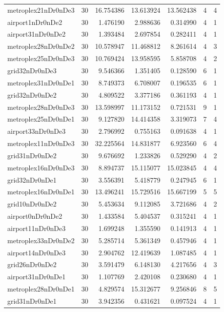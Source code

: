 \documentclass[../../../thesis.tex]{subfiles}
\begin{document}
\begin{longtable}{|l|r|r|r|r|r|r|}
metroplex21nDr0nDe3 & 30 & 16.754386 & 13.613924 & 13.562438 & 4 & 4 \\
airport1nDr0nDe2 & 30 & 1.476190 & 2.988636 & 0.314990 & 4 & 1 \\
airport31nDr0nDe2 & 30 & 1.393484 & 2.697854 & 0.282411 & 4 & 1 \\
metroplex28nDr0nDe2 & 30 & 10.578947 & 11.468812 & 8.261614 & 4 & 3 \\
metroplex25nDr0nDe3 & 30 & 10.769424 & 13.958595 & 5.858708 & 4 & 2 \\
grid32nDr0nDe3 & 30 & 9.546366 & 1.351405 & 0.128590 & 6 & 1 \\
metroplex31nDr0nDe1 & 30 & 8.749373 & 6.708007 & 0.196535 & 6 & 1 \\
grid32nDr0nDe2 & 30 & 4.809522 & 3.377186 & 0.361193 & 4 & 1 \\
metroplex28nDr0nDe3 & 30 & 13.598997 & 11.173152 & 0.721531 & 9 & 1 \\
metroplex25nDr0nDe1 & 30 & 9.127820 & 14.414358 & 3.319073 & 7 & 4 \\
airport33nDr0nDe3 & 30 & 2.796992 & 0.755163 & 0.091638 & 4 & 1 \\
metroplex11nDr0nDe3 & 30 & 32.225564 & 14.831877 & 6.923560 & 6 & 4 \\
grid31nDr0nDe2 & 30 & 9.676692 & 1.233826 & 0.529290 & 4 & 2 \\
metroplex16nDr0nDe3 & 30 & 8.894737 & 15.115077 & 15.023845 & 4 & 4 \\
grid32nDr0nDe1 & 30 & 3.556391 & 5.418779 & 0.247945 & 6 & 1 \\
metroplex16nDr0nDe1 & 30 & 13.496241 & 15.729516 & 15.667199 & 5 & 5 \\
grid10nDr0nDe2 & 30 & 5.453634 & 9.112085 & 3.721686 & 4 & 2 \\
airport0nDr0nDe2 & 30 & 1.433584 & 5.404537 & 0.315241 & 4 & 1 \\
airport11nDr0nDe3 & 30 & 1.699248 & 1.355590 & 0.141913 & 4 & 1 \\
metroplex33nDr0nDe2 & 30 & 5.285714 & 5.361349 & 0.457946 & 4 & 1 \\
airport14nDr0nDe3 & 30 & 2.904762 & 12.419639 & 1.087485 & 4 & 1 \\
grid26nDr0nDe2 & 30 & 3.591479 & 6.148130 & 4.217656 & 4 & 3 \\
airport31nDr0nDe1 & 30 & 1.107769 & 2.420108 & 0.230680 & 4 & 1 \\
metroplex28nDr0nDe1 & 30 & 4.829574 & 15.312677 & 9.256846 & 8 & 5 \\
grid31nDr0nDe1 & 30 & 3.942356 & 0.431621 & 0.097524 & 4 & 1 \\

\end{longtable}
\end{document}
